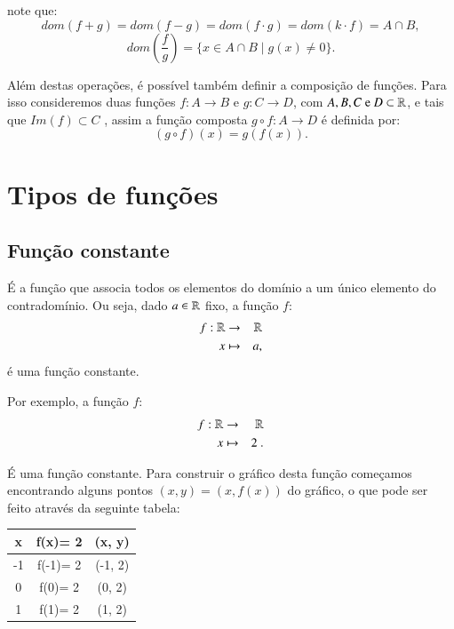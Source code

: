note que:
\[dom(f+g)= dom(f-g)= dom(f \cdot g)= dom(k \cdot f)= A \cap B ,\]
\[ dom\left( \frac{f}{g} \right)= \{x \in A \cap B \mid g(x) \neq 0\}. \]

Além destas operações, é possível também definir a composição de funções. Para isso consideremos duas funções $f: A \rightarrow B$ e $g: C \rightarrow D$, com $A, B, C \text{ e } D \subset \mathbb{R}$, e tais que $Im(f) \subset C$ , assim a função composta $g \circ f: A \rightarrow D$ é definida por:
\[(g \circ f)(x)= g(f(x)). \]

\section{Tipos de funções}

\subsection{Função constante}

É a função que associa todos os elementos do domínio a um único elemento do contradomínio. Ou seja, dado $a \in \mathbb{R}$ fixo, a função $f$:
\begin{eqnarray*}
 f: \mathbb{R} & \rightarrow & \mathbb{R} \\
 x & \mapsto & a,
\end{eqnarray*}
é uma função constante.

Por exemplo, a função $f$:
\begin{eqnarray*}
 f: \mathbb{R} & \rightarrow & \mathbb{R} \\
 x & \mapsto & 2 \ .
\end{eqnarray*}

É uma função constante. Para construir o gráfico desta função começamos encontrando alguns pontos $(x, y)= (x, f(x))$ do gráfico, o que pode ser feito através da seguinte tabela:

 \begin{table}[H]
 \centering
 \begin{tabular}{|c|c|c|} \hline
 \rowcolor{cinza}
  x & f(x)= 2 & (x, y)  \\\hline
  -1 & f(-1)= 2 & (-1, 2) \\\hline
   0 & f(0)= 2 & (0, 2)  \\\hline
   1 & f(1)= 2 & (1, 2) \\\hline
 \end{tabular}
\end{table}

